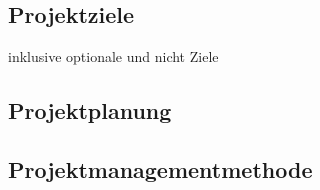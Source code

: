 \chapter{\docname}
\label{\docname}

\section{Projektziele}

\color{red}
inklusive optionale und nicht Ziele
\color{black}

\section{Projektplanung}


\section{Projektmanagementmethode}